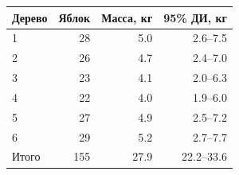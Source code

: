\begin{tabular}{lrrr}
\hline
Дерево & Яблок & Масса, кг & 95\% ДИ, кг \\
\hline
1 & 28 & 5.0 & 2.6--7.5 \\
2 & 26 & 4.7 & 2.4--7.0 \\
3 & 23 & 4.1 & 2.0--6.3 \\
4 & 22 & 4.0 & 1.9--6.0 \\
5 & 27 & 4.9 & 2.5--7.2 \\
6 & 29 & 5.2 & 2.7--7.7 \\
\hline
Итого & 155 & 27.9 & 22.2--33.6 \\
\end{tabular}
